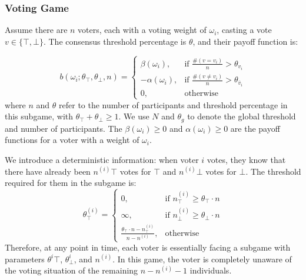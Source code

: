 \documentclass[11pt]{article}
\begin{document}
  \subsubsection{Voting Game}
  Assume there are $n$ voters, each with a voting weight of $\omega_i$, casting a vote $v\in{\{\top,\bot\}}$. The consensus threshold percentage is $\theta$, and their payoff function is:
  
  \begin{equation}
  b(\omega_i; \theta_\top,\theta_\bot, n) = 
  \begin{cases}
  \beta(\omega_i), & \text{if } \frac{\#(v = v_i)}{n} > \theta_{v_i} \\
  -\alpha(\omega_i), & \text{if } \frac{\#(v \neq v_i)}{n} > \theta_{\bar{v}_i} \\
  0, & \text{otherwise}
  \end{cases}
  \end{equation}
  where $n$ and $\theta$ refer to the number of participants and threshold percentage in this subgame, with $\theta_\top+\theta_\bot\geq 1$. We use $N$ and $\theta_g$ to denote the global threshold and number of participants. The $\beta(\omega_i)\geq 0$ and $\alpha(\omega_i)\geq 0$ are the payoff functions for a voter with a weight of $\omega_i$.
  
  We introduce a deterministic information: when voter $i$ votes, they know that there have already been $n^{(i)}\top$ votes for $\top$ and $n^{(i)}\bot$ votes for $\bot$. The threshold required for them in the subgame is:
  \begin{equation}
    \theta^{(i)}_\top = 
    \begin{cases}
      0, & \text{if } n^{(i)}_\top \geq \theta_\top\cdot n \\
      \infty, & \text{if } n^{(i)}_\bot \geq \theta_\bot\cdot n \\
      \frac{\theta_\top\cdot n - n^{(i)}_\top}{n - n^{(i)}}, & \text{otherwise}
    \end{cases}
  \end{equation}
  Therefore, at any point in time, each voter is essentially facing a subgame with parameters $\theta^i\top$, $\theta^i_\bot$, and $n^{(i)}$. In this game, the voter is completely unaware of the voting situation of the remaining $n-n^{(i)}-1$ individuals.
\end{document}
